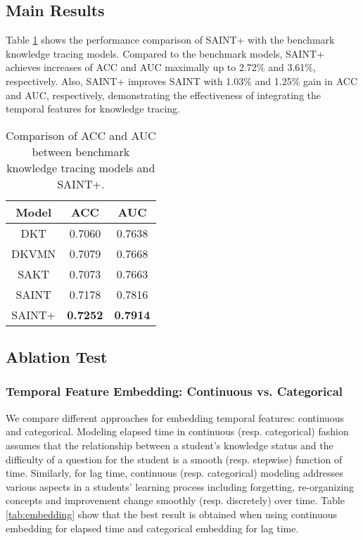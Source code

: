 \subsection{Main Results}

Table \ref{tab:main} shows the performance comparison of SAINT+ with the benchmark knowledge tracing models.
Compared to the benchmark models, SAINT+ achieves increases of ACC and AUC maximally up to 2.72\% and 3.61\%, respectively.
Also, SAINT+ improves SAINT with 1.03\% and 1.25\% gain in ACC and AUC, respectively, demonstrating the effectiveness of integrating the temporal features for knowledge tracing. 

\begin{table}[ht]
\caption{Comparison of ACC and AUC between benchmark knowledge tracing models and SAINT+.}
\centering
\begin{tabular}{ccc}
\toprule
Model & ACC & AUC \\ 
\midrule
DKT & 0.7060 & 0.7638 \\
DKVMN & 0.7079 & 0.7668 \\
SAKT & 0.7073 & 0.7663 \\
\midrule
SAINT & 0.7178 & 0.7816 \\
SAINT+ & \textbf{0.7252} & \textbf{0.7914} \\
\bottomrule
\end{tabular}
\label{tab:main}
\end{table}

\subsection{Ablation Test}
\subsubsection{Temporal Feature Embedding: Continuous vs. Categorical}
We compare different approaches for embedding temporal features: continuous and categorical.
Modeling elapsed time in continuous (resp. categorical) fashion assumes that the relationship between a student’s knowledge status and the difficulty of a question for the student is a smooth (resp. stepwise) function of time.
Similarly, for lag time, continuous (resp. categorical) modeling addresses various aspects in a students’ learning process including forgetting, re-organizing concepts and improvement change smoothly (resp. discretely) over time.
Table \ref{tab:embedding} show that the best result is obtained when using continuous embedding for elapsed time and categorical embedding for lag time.

